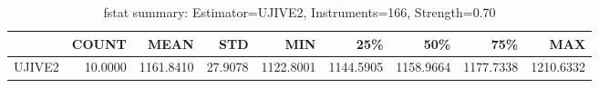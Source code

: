 \begin{table}[ht]
\centering
\caption{fstat summary: Estimator=UJIVE2, Instruments=166, Strength=0.70}
\begin{tabular}{lrrrrrrrr}
\toprule
 & COUNT & MEAN & STD & MIN & 25\% & 50\% & 75\% & MAX \\
\midrule
UJIVE2 & 10.0000 & 1161.8410 & 27.9078 & 1122.8001 & 1144.5905 & 1158.9664 & 1177.7338 & 1210.6332 \\
\bottomrule
\end{tabular}
\end{table}
